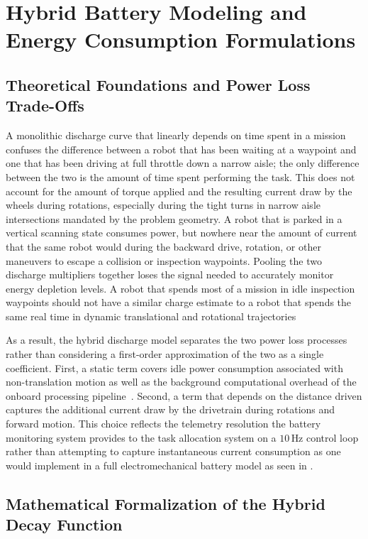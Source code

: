 \section{Hybrid Battery Modeling and Energy Consumption Formulations}

\subsection{Theoretical Foundations and Power Loss Trade-Offs}

A monolithic discharge curve that linearly depends on time spent in a mission confuses the difference between a robot that has been waiting at a waypoint and one that has been driving at full throttle down a narrow aisle; the only difference between the two is the amount of time spent performing the task. This does not account for the amount of torque applied and the resulting current draw by the wheels during rotations, especially during the tight turns in narrow aisle intersections mandated by the problem geometry. A robot that is parked in a vertical scanning state consumes power, but nowhere near the amount of current that the same robot would during the backward drive, rotation, or other maneuvers to escape a collision or inspection waypoints. Pooling the two discharge multipliers together loses the signal needed to accurately monitor energy depletion levels. A robot that spends most of a mission in idle inspection waypoints should not have a similar charge estimate to a robot that spends the same real time in dynamic translational and rotational trajectories

As a result, the hybrid discharge model separates the two power loss processes rather than considering a first-order approximation of the two as a single coefficient. First, a static term covers idle power consumption associated with non-translation motion as well as the background computational overhead of the onboard processing pipeline~\cite{mohamed2021energy}. Second, a term that depends on the distance driven captures the additional current draw by the drivetrain during rotations and forward motion. This choice reflects the telemetry resolution the battery monitoring system provides to the task allocation system on a $10\,\text{Hz}$ control loop rather than attempting to capture instantaneous current consumption as one would implement in a full electromechanical battery model as seen in \cite{mei2005case, realtime2026estimation}.

\subsection{Mathematical Formalization of the Hybrid Decay Function}

